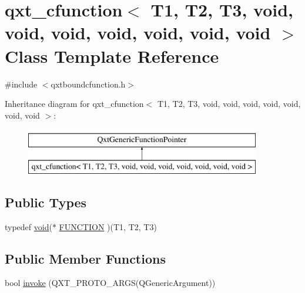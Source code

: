 \hypertarget{classqxt__cfunction_3_01_t1_00_01_t2_00_01_t3_00_01void_00_01void_00_01void_00_01void_00_01void_00_01void_00_01void_01_4}{\section{qxt\-\_\-cfunction$<$ T1, T2, T3, void, void, void, void, void, void, void $>$ Class Template Reference}
\label{classqxt__cfunction_3_01_t1_00_01_t2_00_01_t3_00_01void_00_01void_00_01void_00_01void_00_01void_00_01void_00_01void_01_4}
}


{\ttfamily \#include $<$qxtboundcfunction.\-h$>$}

Inheritance diagram for qxt\-\_\-cfunction$<$ T1, T2, T3, void, void, void, void, void, void, void $>$\-:\begin{figure}[H]
\begin{center}
\leavevmode
\includegraphics[height=2.000000cm]{classqxt__cfunction_3_01_t1_00_01_t2_00_01_t3_00_01void_00_01void_00_01void_00_01void_00_01void_00_01void_00_01void_01_4}
\end{center}
\end{figure}
\subsection*{Public Types}
\begin{DoxyCompactItemize}
\item 
typedef \hyperlink{group___u_a_v_objects_plugin_ga444cf2ff3f0ecbe028adce838d373f5c}{void}($\ast$ \hyperlink{classqxt__cfunction_3_01_t1_00_01_t2_00_01_t3_00_01void_00_01void_00_01void_00_01void_00_01void_00_01void_00_01void_01_4_a73c3c0733711062826233257e1827edf}{F\-U\-N\-C\-T\-I\-O\-N} )(T1, T2, T3)
\end{DoxyCompactItemize}
\subsection*{Public Member Functions}
\begin{DoxyCompactItemize}
\item 
bool \hyperlink{classqxt__cfunction_3_01_t1_00_01_t2_00_01_t3_00_01void_00_01void_00_01void_00_01void_00_01void_00_01void_00_01void_01_4_af7f75ce5dce90759bd0fd22b7373547e}{invoke} (Q\-X\-T\-\_\-\-P\-R\-O\-T\-O\-\_\-A\-R\-G\-S(Q\-Generic\-Argument))
\end{DoxyCompactItemize}
